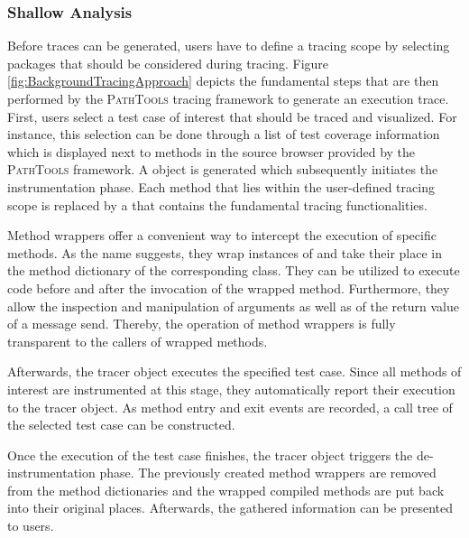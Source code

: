 \subsubsection{Shallow Analysis}
Before traces can be generated, users have to define a tracing scope by selecting  packages that should be considered during tracing.
Figure \ref{fig:BackgroundTracingApproach} depicts the fundamental steps that are then performed by the \textsc{PathTools} tracing framework to generate an execution trace.
First, users select a test case of interest that should be traced and visualized.
For instance, this selection can be done through a list of test coverage information which is displayed next to methods in the source browser provided by the \textsc{PathTools} framework.
A  object is generated which subsequently initiates the instrumentation phase.
Each method that lies within the user-defined tracing scope is replaced by a  that contains the fundamental tracing functionalities.

Method wrappers \cite{brant_wrappers_1998} offer a convenient way to intercept the execution of specific methods.
As the name suggests, they wrap instances of  and take their place in the method dictionary of the corresponding class.
They can be utilized to execute code before and after the invocation of the wrapped method.
Furthermore, they allow the inspection and manipulation of arguments as well as of the return value of a message send.
Thereby, the operation of method wrappers is fully transparent to the callers of wrapped methods.

Afterwards, the tracer object executes the specified test case.
Since all methods of interest are instrumented at this stage, they automatically report their execution to the tracer object.
As method entry and exit events are recorded, a call tree of the selected test case can be constructed.

Once the execution of the test case finishes, the tracer object triggers the de-instrumentation phase.
The previously created method wrappers are removed from the method dictionaries and the wrapped compiled methods are put back into their original places.
Afterwards, the gathered information can be presented to users.

